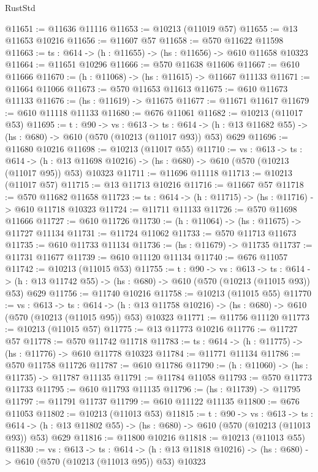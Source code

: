 \begin{lexlean}{RustStd}
\begin{coremodule}
@11651 := @11636 @11116
@11653 := @10213 (@11019 @57)
@11655 := @13 @11653 @10216
@11656 := @11607 @57
@11658 := @570 @11622 @11598
@11663 := {ts : @614} -> (h : @11655) -> (hs : @11656) -> @610 @11658 @10323
@11664 := @11651 @10296
@11666 := @570 @11638 @11606
@11667 := @610 @11666
@11670 := (h : @11068) -> (hs : @11615) -> @11667 @11133
@11671 := @11664 @11066
@11673 := @570 @11653 @11613
@11675 := @610 @11673 @11133
@11676 := (hs : @11619) -> @11675
@11677 := @11671 @11617
@11679 := @610 @11118 @11133
@11680 := @676 @11061
@11682 := @10213 (@11017 @53)
@11695 := {t : @90} ->
  {vs : @613} ->
  {ts : @614} -> (h : @13 @11682 @55) -> (hs : @680) -> @610 (@570 (@10213 (@11017 @93)) @53) @629
@11696 := @11680 @10216
@11698 := @10213 (@11017 @55)
@11710 := {vs : @613} ->
  {ts : @614} ->
  (h : @13 @11698 @10216) -> (hs : @680) -> @610 (@570 (@10213 (@11017 @95)) @53) @10323
@11711 := @11696 @11118
@11713 := @10213 (@11017 @57)
@11715 := @13 @11713 @10216
@11716 := @11667 @57
@11718 := @570 @11682 @11658
@11723 := {ts : @614} -> (h : @11715) -> (hs : @11716) -> @610 @11718 @10323
@11724 := @11711 @11133
@11726 := @570 @11698 @11666
@11727 := @610 @11726
@11730 := (h : @11064) -> (hs : @11675) -> @11727 @11134
@11731 := @11724 @11062
@11733 := @570 @11713 @11673
@11735 := @610 @11733 @11134
@11736 := (hs : @11679) -> @11735
@11737 := @11731 @11677
@11739 := @610 @11120 @11134
@11740 := @676 @11057
@11742 := @10213 (@11015 @53)
@11755 := {t : @90} ->
  {vs : @613} ->
  {ts : @614} -> (h : @13 @11742 @55) -> (hs : @680) -> @610 (@570 (@10213 (@11015 @93)) @53) @629
@11756 := @11740 @10216
@11758 := @10213 (@11015 @55)
@11770 := {vs : @613} ->
  {ts : @614} ->
  (h : @13 @11758 @10216) -> (hs : @680) -> @610 (@570 (@10213 (@11015 @95)) @53) @10323
@11771 := @11756 @11120
@11773 := @10213 (@11015 @57)
@11775 := @13 @11773 @10216
@11776 := @11727 @57
@11778 := @570 @11742 @11718
@11783 := {ts : @614} -> (h : @11775) -> (hs : @11776) -> @610 @11778 @10323
@11784 := @11771 @11134
@11786 := @570 @11758 @11726
@11787 := @610 @11786
@11790 := (h : @11060) -> (hs : @11735) -> @11787 @11135
@11791 := @11784 @11058
@11793 := @570 @11773 @11733
@11795 := @610 @11793 @11135
@11796 := (hs : @11739) -> @11795
@11797 := @11791 @11737
@11799 := @610 @11122 @11135
@11800 := @676 @11053
@11802 := @10213 (@11013 @53)
@11815 := {t : @90} ->
  {vs : @613} ->
  {ts : @614} -> (h : @13 @11802 @55) -> (hs : @680) -> @610 (@570 (@10213 (@11013 @93)) @53) @629
@11816 := @11800 @10216
@11818 := @10213 (@11013 @55)
@11830 := {vs : @613} ->
  {ts : @614} ->
  (h : @13 @11818 @10216) -> (hs : @680) -> @610 (@570 (@10213 (@11013 @95)) @53) @10323

\end{coremodule}
\end{lexlean}
